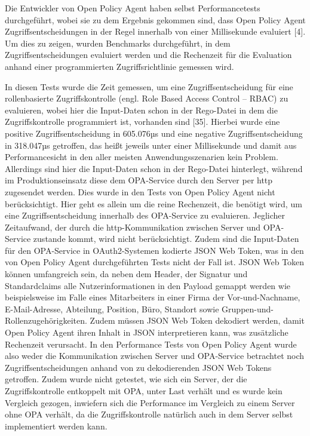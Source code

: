 Die Entwickler von Open Policy Agent haben selbst Performancetests durchgeführt, wobei sie zu dem Ergebnis gekommen sind, dass Open Policy Agent Zugriffsentscheidungen in der Regel innerhalb von einer Millisekunde evaluiert [4]. Um dies zu zeigen, wurden Benchmarks durchgeführt, in dem Zugriffsentscheidungen evaluiert werden und die Rechenzeit für die Evaluation anhand einer programmierten Zugriffsrichtlinie gemessen wird.\smallskip

In diesen Tests wurde die Zeit gemessen, um eine Zugriffsentscheidung für eine rollenbasierte Zugriffskontrolle (engl. Role Based Access Control – RBAC) zu evaluieren, wobei hier die Input-Daten schon in der Rego-Datei in dem die Zugriffskontrolle programmiert ist, vorhanden sind [35]. Hierbei wurde eine positive Zugriffsentscheidung in 605.076µs und eine negative Zugriffsentscheidung in 318.047µs getroffen, das heißt jeweils unter einer Millisekunde und damit aus Performancesicht in den aller meisten Anwendungsszenarien kein Problem. 
Allerdings sind hier die Input-Daten schon in der Rego-Datei hinterlegt, während im Produktionseinsatz diese dem OPA-Service durch den Server per http zugesendet werden. Dies wurde in den Tests von Open Policy Agent nicht berücksichtigt. Hier geht es allein um die reine Rechenzeit, die benötigt wird, um eine Zugriffsentscheidung innerhalb des OPA-Service zu evaluieren. Jeglicher Zeitaufwand, der durch die http-Kommunikation zwischen Server und OPA-Service zustande kommt, wird nicht berücksichtigt. 
Zudem sind die Input-Daten für den OPA-Service in OAuth2-Systemen kodierte JSON Web Token, was in den von Open Policy Agent durchgeführten Tests nicht der Fall ist. JSON Web Token können umfangreich sein, da neben dem Header, der Signatur und Standardclaims alle Nutzerinformationen in den Payload gemappt werden wie beispielsweise im Falle eines Mitarbeiters in einer Firma der Vor-und-Nachname, E-Mail-Adresse, Abteilung, Position, Büro, Standort sowie Gruppen-und-Rollenzugehörigkeiten. Zudem müssen JSON Web Token dekodiert werden, damit Open Policy Agent ihren Inhalt in JSON interpretieren kann, was zusätzliche Rechenzeit verursacht. 
In den Performance Tests von Open Policy Agent wurde also weder die Kommunikation zwischen Server und OPA-Service betrachtet noch Zugriffsentscheidungen anhand von zu dekodierenden JSON Web Tokens getroffen. Zudem wurde nicht getestet, wie sich ein Server, der die Zugriffskontrolle entkoppelt mit OPA, unter Last verhält und es wurde kein Vergleich gezogen, inwiefern sich die Performance im Vergleich zu einem Server ohne OPA verhält, da die Zugriffskontrolle natürlich auch in dem Server selbst implementiert werden kann. 
